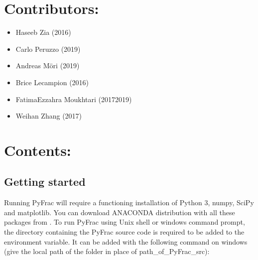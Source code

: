 \documentclass[letterpaper,10pt,english]{sphinxmanual}
\begin{document}
\chapter{Contributors:}
\label{\detokenize{index:contributors}}\begin{itemize}
\item {} 
\sphinxAtStartPar
Haseeb Zia (2016\sphinxhyphen{})

\item {} 
\sphinxAtStartPar
Carlo Peruzzo (2019\sphinxhyphen{})

\item {} 
\sphinxAtStartPar
Andreas Möri (2019\sphinxhyphen{})

\item {} 
\sphinxAtStartPar
Brice Lecampion (2016\sphinxhyphen{})

\item {} 
\sphinxAtStartPar
Fatima\sphinxhyphen{}Ezzahra Moukhtari (2017\sphinxhyphen{}2019)

\item {} 
\sphinxAtStartPar
Weihan Zhang (2017)

\end{itemize}


\chapter{Contents:}
\label{\detokenize{index:contents}}
\sphinxstepscope


\section{Getting started}
\label{\detokenize{GettingStarted:getting-started}}\label{\detokenize{GettingStarted::doc}}
\sphinxAtStartPar
Running PyFrac will require a functioning installation of Python 3, numpy, SciPy and matplotlib. You can download ANACONDA distribution with all these packages from . To run PyFrac using Unix shell or windows command prompt, the directory containing the PyFrac source code is required to be added to the  environment variable. It can be added with the following command on windows (give the local path of the  folder in place of path\_of\_PyFrac\_src):

\begin{sphinxVerbatim}[commandchars=\\\{\}]
 
\end{sphinxVerbatim}
\end{document}
